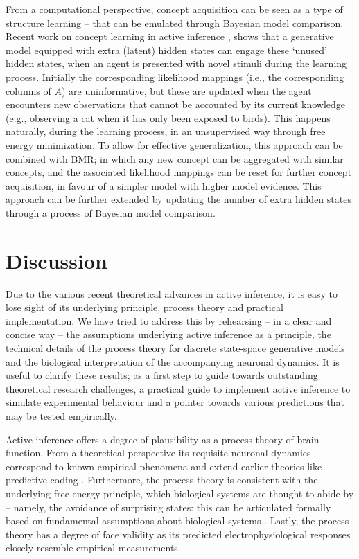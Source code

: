 \documentclass{article}
\begin{document}
From a computational perspective, concept acquisition can be seen as a type of structure learning \cite{gershmanLearningLatentStructure2010,tervoNeuralImplementationStructure2016} – that can be emulated through Bayesian model comparison. Recent work on concept learning in active inference \cite{smithActiveInferenceModel2019}, shows that a generative model equipped with extra (latent) hidden states can engage these ‘unused’ hidden states, when an agent is presented with novel stimuli during the learning process. Initially the corresponding likelihood mappings (i.e., the corresponding columns of $A$) are uninformative, but these are updated when the agent encounters new observations that cannot be accounted by its current knowledge (e.g., observing a cat when it has only been exposed to birds). This happens naturally, during the learning process, in an unsupervised way through free energy minimization. To allow for effective generalization, this approach can be combined with BMR; in which any new concept can be aggregated with similar concepts, and the associated likelihood mappings can be reset for further concept acquisition, in favour of a simpler model with higher model evidence. This approach can be further extended by updating the number of extra hidden states through a process of Bayesian model comparison.

\section{Discussion}
Due to the various recent theoretical advances in active inference, it is easy to lose sight of its underlying principle, process theory and practical implementation. We have tried to address this by rehearsing – in a clear and concise way – the assumptions underlying active inference as a principle, the technical details of the process theory for discrete state-space generative models and the biological interpretation of the accompanying neuronal dynamics. It is useful to clarify these results; as a first step to guide towards outstanding theoretical research challenges, a practical guide to implement active inference to simulate experimental behaviour and a pointer towards various predictions that may be tested empirically.

Active inference offers a degree of plausibility as a process theory of brain function. From a theoretical perspective its requisite neuronal dynamics correspond to known empirical phenomena and extend earlier theories like predictive coding \cite{fristonFreeenergyPrincipleUnified2010,raoPredictiveCodingVisual1999,bastosCanonicalMicrocircuitsPredictive2012}. Furthermore, the process theory is consistent with the underlying free energy principle, which biological systems are thought to abide by – namely, the avoidance of surprising states: this can be articulated formally based on fundamental assumptions about biological systems \cite{parrMarkovBlanketsInformation2019,fristonFreeEnergyPrinciple2019}. Lastly, the process theory has a degree of face validity as its predicted electrophysiological responses closely resemble empirical measurements.
\end{document}
